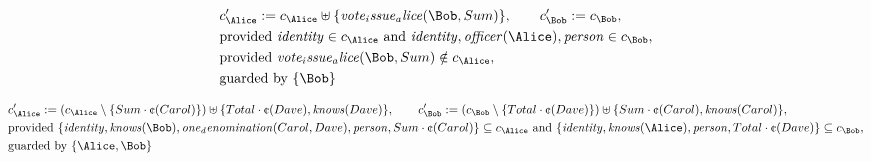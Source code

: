 \begin{align*}
&
c'_
{
\Alice
}
 := 
c_
{
\Alice
}
 \uplus 
\{
\mathit{
vote_issue_alice
}
(
\Bob
,
Sum
)
\}
, \qquad 
c'_
{
\Bob
}
 := 
c_
{
\Bob
}
,\\
&
\text{provided } 
\mathit{
identity
}
 \in c_
{
\Alice
}
 \text{ and } 
\mathit{
identity
}
,
\mathit{
officer
}
(
\Alice
)
,
\mathit{
person
}
 \in c_
{
\Bob
}
,\\
&
\text{provided } 
\mathit{
vote_issue_alice
}
(
\Bob
,
Sum
)
 \notin c_
{
\Alice
}
,\\
&
\text{guarded by } \{
\Bob
\}
\end{align*}

\begin{align*}
&
c'_
{
\Alice
}
 := 
(c_
{
\Alice
}
 \setminus 
\{
Sum
\cdot
\text{\textcent}
(
Carol
)
\}
) \uplus 
\{
Total
\cdot
\text{\textcent}
(
Dave
)
,
\mathit{
knows
}
(
Dave
)
\}
, \qquad 
c'_
{
\Bob
}
 := 
(c_
{
\Bob
}
 \setminus 
\{
Total
\cdot
\text{\textcent}
(
Dave
)
\}
) \uplus 
\{
Sum
\cdot
\text{\textcent}
(
Carol
)
,
\mathit{
knows
}
(
Carol
)
\}
,\\
&
\text{provided } 
\{
\mathit{
identity
}
,
\mathit{
knows
}
(
\Bob
)
,
\mathit{
one_denomination
}
(
Carol
,
Dave
)
,
\mathit{
person
}
,
Sum
\cdot
\text{\textcent}
(
Carol
)
\}
 \subseteq c_
{
\Alice
}
 \text{ and } 
\{
\mathit{
identity
}
,
\mathit{
knows
}
(
\Alice
)
,
\mathit{
person
}
,
Total
\cdot
\text{\textcent}
(
Dave
)
\}
 \subseteq c_
{
\Bob
}
,\\
&
\text{guarded by } \{
\Alice
,
\Bob
\}
\end{align*}

